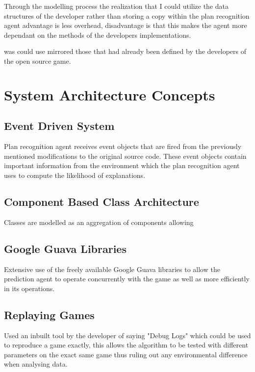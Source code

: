 \documentclass[parskip]{cs4rep}
\begin{document}
Through the modelling process the realization that I could utilize the data structures of the developer rather than storing a copy within the plan recognition agent advantage is less overhead, disadvantage is that this makes the agent more dependant on the methods of the developers implementations.

 was could use mirrored those that had already been defined by the developers of the open source game.

\section{System Architecture Concepts}

\subsection{Event Driven System}

Plan recognition agent receives event objects that are fired from the previously mentioned modifications to the original source code. These event objects contain important information from the environment which the plan recognition agent uses to compute the likelihood of explanations.

\subsection{Component Based Class Architecture}

Classes are modelled as an aggregation of components allowing

\subsection{Google Guava Libraries}

Extensive use of the freely available Google Guava libraries to allow the prediction agent to operate concurrently with the game as well as more efficiently in its operations.

\subsection{Replaying Games}

Used an inbuilt tool by the developer of saying "Debug Logs" which could be used to reproduce a game exactly, this allows the algorithm to be tested with different parameters on the exact same game thus ruling out any environmental difference when analysing data.
\end{document}

